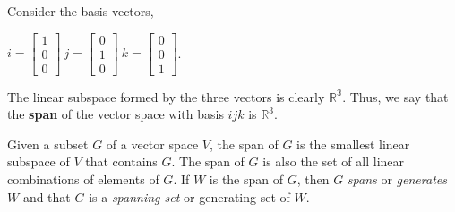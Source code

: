 \documentclass[12pt]{report}
\begin{document}
Consider the basis vectors,
\begin{center}
$i=\begin{bmatrix}1 \\ 0 \\ 0\end{bmatrix}~j=\begin{bmatrix}0\\1\\0\end{bmatrix}~k=\begin{bmatrix}0\\0\\1\end{bmatrix}$.
\end{center}
The linear subspace formed by the three vectors is clearly $\mathbb{R^3}$. Thus, we say that the \textbf{span} of the vector space with basis $ijk$ is $\mathbb{R}^3$.

Given a subset $G$ of a vector space $V$, the span of $G$ is the smallest linear subspace of $V$ that contains $G$. The span of $G$ is also the set of all linear combinations of elements of $G$.
If $W$ is the span of $G$, then $G$ \textit{spans} or \textit{generates} $W$ and that $G$ is a \textit{spanning set} or generating set of $W$.
\end{document}
